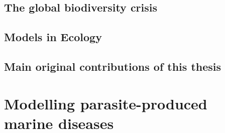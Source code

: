\documentclass[
	10pt, %
	fleqn, %
	a4paper, %
]{LegrandOrangeBook}
\begin{document}
\chapterspaceabove{6.75cm}
\chapterspacebelow{7.25cm}

\chapter{The global biodiversity crisis}


\chapterspaceabove{6.75cm}
\chapterspacebelow{7.25cm}

\chapter{Models in Ecology}


\chapterspaceabove{6.75cm}
\chapterspacebelow{7.25cm}

\chapter{Main original contributions of this thesis}


\part{Modelling parasite-produced marine diseases}

\chapterspaceabove{6.75cm}
\chapterspacebelow{7.25cm}
\end{document}

